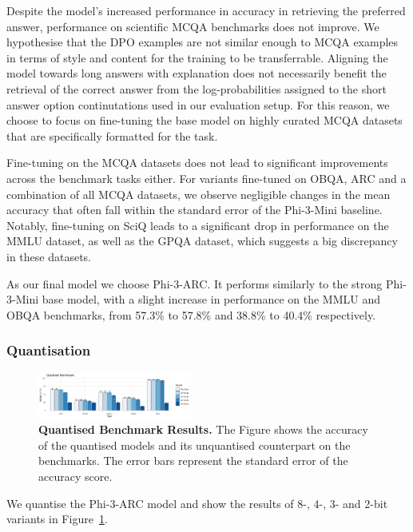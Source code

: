 Despite the model's increased performance in accuracy in retrieving the preferred answer, performance on
scientific MCQA benchmarks does not improve. We hypothesise that the DPO examples are not similar enough to
MCQA examples in terms of style and content for the training to be transferrable. Aligning
the model towards long answers with explanation does not necessarily benefit the
retrieval of the correct answer from the log-probabilities assigned to the short
answer option continutations used in our evaluation setup. For this reason, we
choose to focus on fine-tuning the base model on highly curated MCQA datasets
that are specifically formatted for the task.


Fine-tuning on the MCQA datasets does not lead to significant
improvements across the benchmark tasks either. For variants fine-tuned on OBQA, ARC
and a combination of all MCQA datasets, we observe negligible changes in the mean
accuracy that often fall within the standard error of the Phi-3-Mini baseline.
Notably, fine-tuning on SciQ leads to a significant drop in performance on the
MMLU dataset, as well as the GPQA dataset, which suggests a big discrepancy in these datasets.


As our final model we choose Phi-3-ARC. It
performs similarly to the strong Phi-3-Mini base model, with a slight increase in
performance on the MMLU and OBQA benchmarks, from 57.3\% to 57.8\% and 38.8\% to
40.4\% respectively.

\subsubsection{Quantisation}

\begin{figure}[ht]
    \centering
    \includegraphics[width=0.45\textwidth]{figures/quantised-benchmark.png}
    \caption{\textbf{Quantised Benchmark Results.} The Figure shows the accuracy of the quantised models and its unquantised counterpart on the benchmarks. The error bars represent the standard error of the accuracy score.}
    \label{fig:quantised-benchmark}
\end{figure}

We quantise the Phi-3-ARC model and show
the results of 8-, 4-, 3- and 2-bit variants in
Figure~\ref{fig:quantised-benchmark}.

